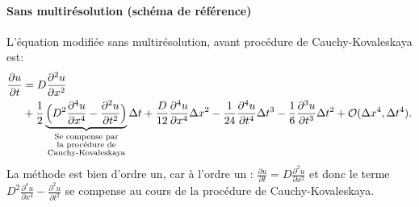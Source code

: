    \paragraph{Sans multirésolution (schéma de référence)}
        L'équation modifiée sans multirésolution, avant procédure de Cauchy-Kovaleskaya est:
        \begin{align}
            \frac{\partial u}{\partial t}  &= D \frac{\partial^{2} u}{\partial x^{2}} \\\notag
                &+ \frac{1}{2} \underbrace{\Bigl(D^{2}\frac{\partial^{4} u}{\partial x^{4}} - \frac{\partial^{2} u}{\partial t^{2}} \Bigr)}_{\substack{\text{Se compense par} \\ \text{la procédure de} \\ \text{Cauchy-Kovaleskaya}}} \Delta t
                + \frac{D}{12} \frac{\partial^{4} u}{\partial x^{4}}  \Delta x^{2}
                - \frac{1}{24} \frac{\partial^{4} u}{\partial t^{4}}  \Delta t^{3} 
                - \frac{1}{6}  \frac{\partial^{3} u}{\partial t^{3}}  \Delta t^{2}
                + \mathcal{O}(\Delta x^4 , \Delta t^4).
        \end{align}
        La méthode est bien d'ordre un, car à l'ordre un : $\frac{\partial u}{\partial t}  = D \frac{\partial^{2} u}{\partial x^{2}}$ et donc le terme $D^{2}\frac{\partial^{4} u}{\partial x^{4}} - \frac{\partial^{2} u}{\partial t^{2}}$
        se compense au cours de la procédure de Cauchy-Kovaleskaya.
